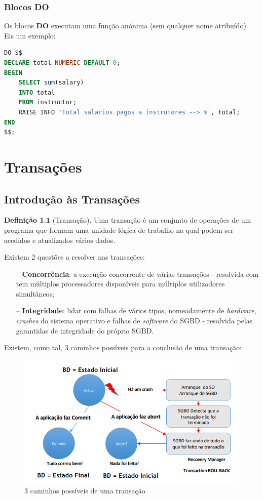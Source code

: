 \documentclass[oneside]{book}
\theoremstyle{definition}
\newtheorem{definition}{Definição}
\begin{document}
\subsection{Blocos DO}
Os blocos \textbf{DO} executam uma função anónima (sem qualquer nome atribuído). Eis um exemplo:
\begin{lstlisting}[language=SQL, morekeywords={DECLARE, FOR, DO, $$, RAISE, INFO}, framesep=8pt, xleftmargin=40pt, framexleftmargin=40pt, frame=tb, framerule=0pt]
DO $$
DECLARE total NUMERIC DEFAULT 0;
BEGIN
    SELECT sum(salary)
    INTO total
    FROM instructor;
    RAISE INFO 'Total salarios pagos a instrutores --> %', total;
END
$$;
\end{lstlisting}

\chapter{Transações}
\section{Introdução às Transações}
\begin{definition}[Transação]
    Uma transação é um conjunto de operações de um programa que formam uma unidade lógica de trabalho na qual podem ser acedidos e atualizados vários dados.
\end{definition}
Existem 2 questões a resolver nas transações:
\begin{itemize}
    \itemsep0cm
    \item[--] \textbf{Concorrência}: a execução concorrente de várias transações - resolvida com tem múltiplos processadores disponíveis para múltiplos utilizadores simultâneos;
    \item[--] \textbf{Integridade}: lidar com falhas de vários tipos, nomeadamente de \textit{hardware}, \textit{crashes} do sistema operativo e falhas de \textit{software} do SGBD - resolvida pelas garantidas de integridade do próprio SGBD.
\end{itemize}

Existem, como tal, 3 caminhos possíveis para a conclusão de uma transação:
\begin{figure}[H]
    \centering
    \includegraphics[scale = 0.4]{cap3/caminhos_transacoes.png}
    \caption{3 caminhos possíveis de uma transação}
\end{figure}
\end{document}
